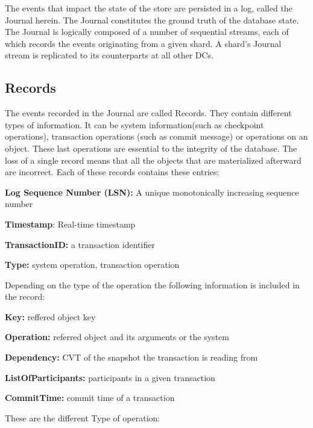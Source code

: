 \documentclass[11pt]{article}
\begin{document}
The events that impact the state of the store are persisted in a log, called the
Journal herein. 
The Journal constitutes the ground truth of the database state. 
The Journal is logically composed of a number of sequential streams, each of
which records the events originating from a given shard. 
A shard’s Journal stream is replicated to its counterparts at all other DCs. 

\subsection{Records}
\label{sec:record}

The events recorded in the Journal are called Records.
They contain different types of information. 
It can be system information(such as checkpoint operations), transaction
operations (such as commit message) or operations on an object.
These last operations are essential to the integrity of the database.
The loss of a single record means that all the objects that are materialized
afterward are incorrect.
Each of these records contains these entries:
\begin{compactitem}
  \item \textbf{Log Sequence Number (LSN):} A unique monotonically increasing 
  sequence number
  \item \textbf{Timestamp}: Real-time timestamp 
  \item \textbf{TransactionID:} a transaction identifier 
  \item \textbf{Type:} system operation, transaction operation
\end{compactitem}
Depending on the type of the operation the following information is included
in the record:
\begin{compactitem}
  \item \textbf{Key:} reffered object key
  \item \textbf{Operation:} referred object and its arguments or the system 
  \item \textbf{Dependency:} CVT of the snapshot the transaction is reading from
  \item \textbf{ListOfParticipants:} participants in a given transaction
  \item \textbf{CommitTime:} commit time of a transaction
\end{compactitem}

These are the different Type of operation:
\end{document}
